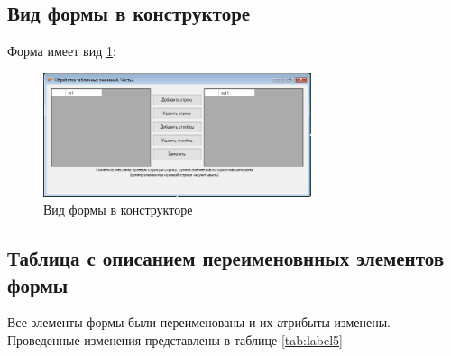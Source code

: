 \subsection{Вид формы в конструкторе}

Форма имеет вид \ref{fig:FormInConstruct5}:

\begin{figure}[!h]
    \centering
    \includegraphics[width = 0.7\textwidth]{images/Task5/FormInConstructor.png}
    \caption{Вид формы в конструкторе}
    \label{fig:FormInConstruct5}
\end{figure}

\subsection{Таблица с описанием переименовнных элементов формы}

Все элементы формы были переименованы и их атрибыты изменены. Проведенные изменения представлены в таблице \ref{tab:label5}

